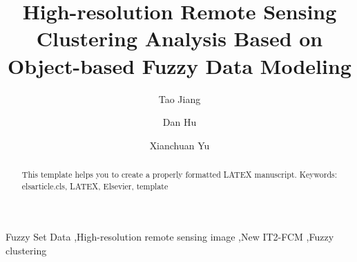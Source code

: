 \documentclass[preprint,12pt,authoryear]{elsarticle}
\begin{document}
\begin{frontmatter}



\title{High-resolution Remote Sensing Clustering Analysis Based on Object-based Fuzzy Data Modeling}



\author[rvt]{Tao Jiang}
\author[rvt]{Dan Hu}
\author[rvt]{Xianchuan Yu}
\address[rvt]{College of Information Science and Technology,
Beijing Normal University, Beijing  100875, China}

\begin{abstract}
This template helps you to create a properly formatted LATEX manuscript.
Keywords: elsarticle.cls, LATEX, Elsevier, template

\end{abstract}

\begin{keyword}
Fuzzy Set Data \sep High-resolution remote sensing image \sep New IT2-FCM \sep Fuzzy clustering


\end{keyword}

\end{frontmatter}
\end{document}
